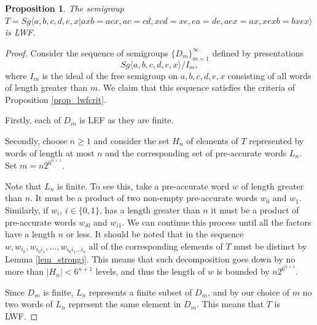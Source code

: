 \documentclass{article}
\newtheorem{proposition}{Proposition}
\theoremstyle{definition}
\begin{document}
\begin{proposition}
The semigroup $T  = Sg\langle a,b,c,d,e,x | axb = acx, ac =
cd, xcd = xe, ea = de, aex = ax, xexb = bxex \rangle$ is LWF.
\end{proposition}
\begin{proof}
Consider the sequence of semigroups $\{D_m\}_{m=1}^{\infty}$ defined by presentations $$Sg\langle a,b,c,d,e,x\rangle / I_m,$$ where $I_m$ is the ideal of the free semigroup on $a,b,c,d,e,x$ consisting of all words of length greater than $m$. We claim that this sequence satisfies the criteria of Proposition \ref{prop_lwfcrit}.

Firstly, each of $D_m$ is LEF as they are finite.

Secondly, choose $n \ge 1$ and consider the set $H_n$ of elements of $T$ represented by words of length at most $n$ and the corresponding set of pre-accurate words $L_n$. Set $m = n 2^{6^{n+1}}$.

Note that $L_n$ is finite. To see this, take a pre-accurate word $w$ of length greater than $n$. It must be a product of two non-empty pre-accurate words $w_0$ and $w_1$. Similarly, if $w_i$, $i \in \{0,1\}$, has a length greater than $n$ it must be a product of pre-accurate  words $w_{i0}$ and $w_{i1}$. We can continue this process until all the factors have a length $n$ or less. It should be noted that in the sequence $w, w_{i_0}, w_{i_0 i_1}, \ldots , w_{i_0 i_1 \ldots i_k}$ all of the corresponding elements of $T$ must be distinct by Lemma \ref{lem_strongj}. This means that such decomposition goes down by no more than $|H_{n}| < 6^{n+1}$ levels, and thus the length of $w$ is bounded by $n 2^{6^{n+1}}$.

Since $D_m$ is finite, $L_n$ represents a finite subset of $D_m$, and by our choice of $m$ no two words of $L_n$ represent the same element in $D_m$. This means that $T$ is LWF.
\end{proof}
\end{document}
